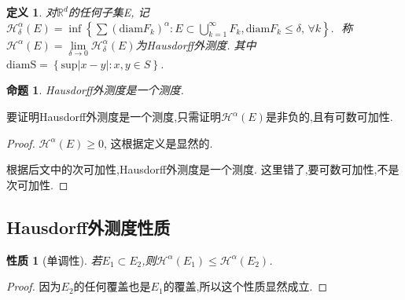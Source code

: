\documentclass[hyperref,a4paper,UTF8]{ctexart}
\newtheorem{definition}{定义}[section]
\newtheorem{proposition}{{命题}}
\newtheorem{property}{{性质}}
\begin{document}
\begin{definition}
  对$\mathbb{R}^d$的任何子集E,
  记 $\mathcal{H}^{\alpha}_{\delta}(E) = \inf \left\{\sum\left(\mathrm{\mathrm{diam}} F_k\right)^\alpha: E \subset \bigcup\limits_{k=1}^{\infty} F_k, \mathrm{diam} F_k \leqslant \delta \text {, } \forall k\right\} \text {. }$
  称$\mathcal{H}^{\alpha}(E)=\lim\limits_{\delta  \to 0}\mathcal{H}^{\alpha}_{\delta}(E)$为Hausdorff外测度.
  其中$\mathrm{diamS} = \left \{\mathrm{sup}{|x-y|:x,y \in S}\right \}$. 
\end{definition}

\begin{proposition}
  Hausdorff外测度是一个测度.
\end{proposition}

要证明Hausdorff外测度是一个测度,只需证明$\mathcal{H}^{\alpha}(E)$是非负的,且有可数可加性. 
\begin{proof}
   $\mathcal{H}^{\alpha}(E) \geqslant 0$, 这根据定义是显然的.

  根据后文中的次可加性,Hausdorff外测度是一个测度. 这里错了,要可数可加性,不是次可加性.
\end{proof}


\subsection{Hausdorff外测度性质}
  \begin{property}[单调性]
    若$E_1 \subset E_2 $,则$\mathcal{H}^{\alpha}(E_1) \leqslant \mathcal{H}^{\alpha}(E_2)$.
  \end{property}
  \begin{proof}
    因为$E_2$的任何覆盖也是$E_1$的覆盖,所以这个性质显然成立.
  \end{proof}
\end{document}
